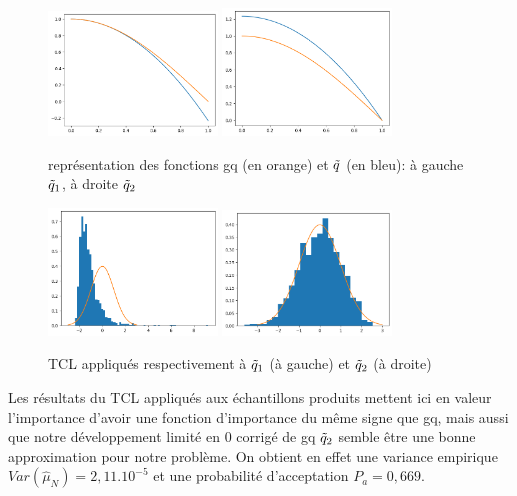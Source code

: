 \documentclass{article}
\begin{document}
\begin{figure}[ht]
\centering
\includegraphics[width=0.4\textwidth]{TP1/DL_ordre2_g.png}
\includegraphics[width=0.4\textwidth]{TP1/DL_ordre2_corrige.png}
\caption{représentation des fonctions gq (en orange) et $\Tilde{q}$ (en bleu): à gauche $\Tilde{q}_1$, à droite $\Tilde{q}_2$}
\label{TP1_IS_DL}
\end{figure}

\begin{figure}[ht]
\centering
\includegraphics[width=0.4\textwidth]{TP1/IS_TCL_DL_ordre2.png}
\includegraphics[width=0.4\textwidth]{TP1/IS_TCL_DL_ordre2_corrige.png}
\caption{TCL appliqués respectivement à $\Tilde{q}_1$ (à gauche) et $\Tilde{q}_2$ (à droite)}
\label{TP1_IS_TCL}
\end{figure}

Les résultats du TCL appliqués aux échantillons produits mettent ici en valeur l'importance d'avoir une fonction d'importance du même signe que gq, mais aussi que notre développement limité en 0 corrigé de gq $\Tilde{q}_2$  semble être une bonne approximation pour notre problème. On obtient en effet une variance empirique $Var(\hat{\mu}_N) = 2,11.10^{-5} $ et une probabilité d'acceptation $P_a = 0,669$.
\end{document}
